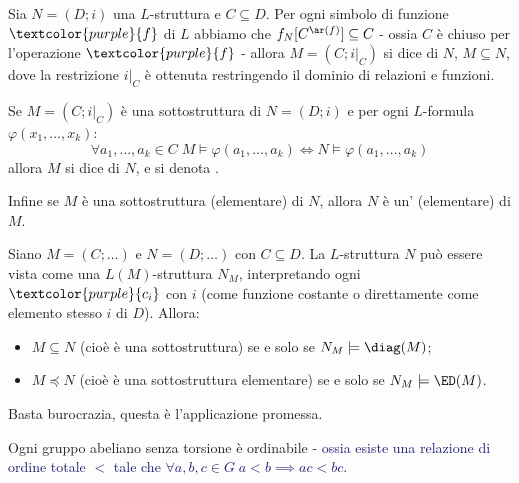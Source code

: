 \begin{definition}[Sottostruttura]
    Sia $N = (D;i)$ una $L$-struttura e $C \subseteq D$. Per ogni simbolo di funzione $\textcolor{purple}{f}$ di $L$ abbiamo che $f_N[C^{\ar(f)}] \subseteq C$ - ossia $C$ è chiuso per l'operazione $\textcolor{purple}{f}$ - allora $M = (C;i|_C)$ 
    si dice  di $N$, $M \subseteq N$, dove la restrizione $i|_C$ è ottenuta restringendo il dominio di relazioni e funzioni.  
\end{definition}

\begin{definition}
    Se $M = (C;i|_C)$ è una sottostruttura di $N = (D;i)$ e per ogni $L$-formula $\varphi(x_1,\ldots,x_k)$:
    \[ \forall a_1,\ldots,a_k \in C \; M \models \varphi(a_1,\ldots,a_k) \iff N \models \varphi(a_1,\ldots,a_k)
    \]
    allora $M$ si dice  di $N$, e si denota .
\end{definition}

\begin{definition}[Estensione]
    Infine se $M$ è una sottostruttura (elementare) di $N$, allora $N$ è un' (elementare) di $M$.
\end{definition}

\begin{remark}
    Siano $M = (C;\ldots)$ e $N = (D;\ldots)$ con $C \subseteq D$. La $L$-struttura $N$ può essere vista come una $L(M)$-struttura $N_M$, interpretando ogni $\textcolor{purple}{c_i}$ con $i$ (come funzione costante o direttamente come elemento stesso $i$ di $D$). Allora:
    \begin{itemize}
        \item $M \subseteq N$ (cioè è una sottostruttura) se e solo se $N_M \models \diag(M)$;
        \item $M \preceq N$ (cioè è una sottostruttura elementare) se e solo se $N_M \models \ED(M)$.
    \end{itemize}
\end{remark}

Basta burocrazia, questa è l'applicazione promessa.

\begin{theorem}[Levi]
    Ogni gruppo abeliano senza torsione è ordinabile \textcolor{MidnightBlue}{- ossia esiste una relazione di ordine totale $<$ tale che $\forall a,b,c \in G \; a < b \implies ac < bc$}.
\end{theorem}

